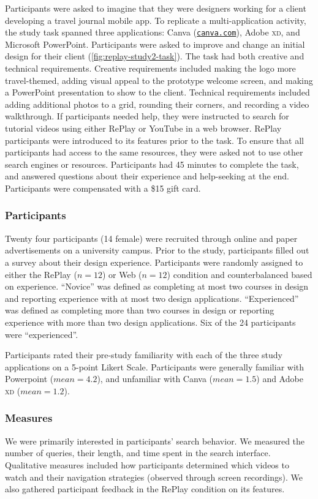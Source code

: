Participants were asked to imagine that they were designers working for a client developing a travel journal mobile app. To replicate a multi-application activity, the study task spanned three applications: Canva (\href{https://canva.com}{\nolinkurl{canva.com}}), Adobe \textsc{xd}, and Microsoft PowerPoint. Participants were asked to improve and change an initial design for their client (\autoref{fig:replay-study2-task}). The task had both creative and technical requirements. Creative requirements included making the logo more travel-themed, adding visual appeal to the prototype welcome screen, and making a PowerPoint presentation to show to the client. Technical requirements included adding additional photos to a grid, rounding their corners, and recording a video walkthrough. If participants needed help, they were instructed to search for tutorial videos using either RePlay or YouTube in a web browser. RePlay participants were introduced to its features prior to the task. To ensure that all participants had access to the same resources, they were asked not to use other search engines or resources. Participants had 45 minutes to complete the task, and answered questions about their experience and help-seeking at the end. Participants were compensated with a \$15 gift card.

\subsubsection{Participants}
Twenty four participants (14 female) were recruited through online and paper advertisements on a university campus. Prior to the study, participants filled out a survey about their design experience. Participants were randomly assigned to either the RePlay ($n\!=\!12$) or Web ($n\!=\!12$) condition and counterbalanced based on experience. ``Novice'' was defined as completing at most two courses in design and reporting experience with at most two design applications. ``Experienced'' was defined as completing more than two courses in design or reporting experience with more than two design applications. Six of the 24 participants were ``experienced''. 

Participants rated their pre-study familiarity with each of the three study applications on a 5-point Likert Scale. Participants were generally familiar with Powerpoint ($mean\!=\!4.2$), and unfamiliar with Canva ($mean\!=\!1.5$) and Adobe \textsc{xd} ($mean\!=\!1.2$).
 
\subsubsection{Measures}
We were primarily interested in participants' search behavior. We measured the number of queries, their length, and time spent in the search interface. Qualitative measures included how participants determined which videos to watch and their navigation strategies (observed through screen recordings). We also gathered participant feedback in the RePlay condition on its features.

